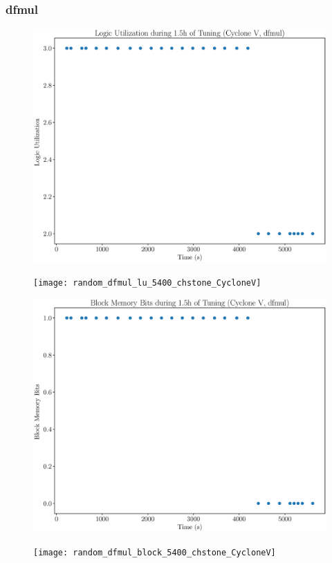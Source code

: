 \documentclass[12pt, a4paper]{article}
\begin{document}
\newpage

\subsubsection{dfmul}

\begin{figure}[htpb]
    \centering
    \noindent
    \begin{minipage}{.48\textwidth}
        \centering
        \includegraphics[scale=.25]{dfmul_lu_5400_chstone_CycloneV}
    \end{minipage}%
    \hfill
    \begin{minipage}{.48\textwidth}
        \centering
        \texttt{[image: random\_dfmul\_lu\_5400\_chstone\_CycloneV]}
    \end{minipage}%

    \begin{minipage}{.48\textwidth}
        \includegraphics[scale=.25]{dfmul_block_5400_chstone_CycloneV}
    \end{minipage}%
    \hfill
    \begin{minipage}{.48\textwidth}
        \texttt{[image: random\_dfmul\_block\_5400\_chstone\_CycloneV]}
    \end{minipage}%


\end{figure}
\end{document}
